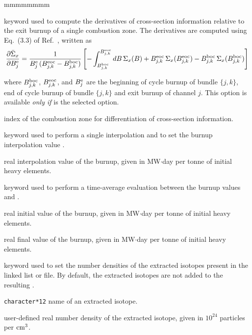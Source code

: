 \begin{ListeDeDescription}{mmmmmmmm}
\item[\moc{AVG-EX-BURN}] keyword used to compute the derivatives of cross-section
information relative to the exit burnup of a single combustion zone. The derivatives are
computed using Eq.~(3.3) of Ref.~, written as
$$
{\partial \bar\Sigma_x\over \partial B_j^{\rm e}}={1\over B_j^{\rm e}\, (B_{j,k}^{\rm eoc}-B_{j,k}^{\rm boc})}
\left[- \int_{B_{j,k}^{\rm boc}}^{B_{j,k}^{\rm eoc}}dB \, \Sigma_x(B)+B_{j,k}^{\rm eoc}\, \Sigma_x(B_{j,k}^{\rm eoc})-B_{j,k}^{\rm boc}\, \Sigma_x(B_{j,k}^{\rm boc})\right]
$$

\noindent where $B_{j,k}^{\rm boc}$, $B_{j,k}^{\rm eoc}$, and $B_j^{\rm e}$ are the beginning of cycle burnup of bundle $\{j,k\}$, end of cycle burnup of bundle $\{j,k\}$ and exit burnup of channel $j$. This option is available {\sl only if}  is the selected option.

\item[\dusa{ivarty}] index of the combustion zone for differentiation of cross-section information.

\item[\moc{I-BURNUP}] keyword used to perform a single interpolation
and to set the burnup interpolation value .

\item[\dusa{burn}] real interpolation value of the burnup, given in
MW$\cdot$day per tonne of initial heavy elements.

\item[\moc{T-BURNUP}] keyword used to perform a time-average
 evaluation between the burnup values 
and .

\item[\dusa{burn0}] real initial value of the burnup, given in MW$\cdot$day
per tonne of initial heavy elements.

\item[\dusa{burn1}] real final value of the burnup, given in MW$\cdot$day
per tonne of initial heavy elements.

\item[\moc{MICRO}] keyword used to set the number densities of the extracted
isotopes present in the  linked list or  file. By default, the
extracted isotopes are not added to the resulting .

\item[\dusa{HISO}] \texttt{character*12} name of an extracted isotope.

\item[\dusa{conc}] user-defined real number density of the extracted isotope,
given in $10^{24}$ particles per ${\rm cm}^3$.


\end{ListeDeDescription}
